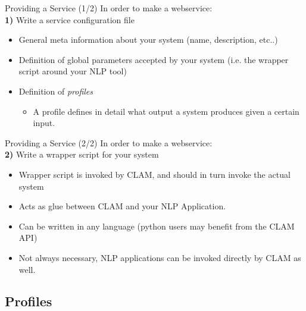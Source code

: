 \documentclass[compress]{beamer}
\begin{document}
\begin{frame}
    \begin{block}{Providing a Service (1/2)}
        In order to make a webservice: \\       
        \textbf{1)} Write a service configuration file
        \begin{itemize}
            \item General meta information about your system {\footnotesize{(name, description, etc..)}}
            \item Definition of global parameters accepted by your system {\footnotesize{(i.e. the wrapper script around your NLP tool)}}
            \item Definition of \emph{profiles}
            \begin{itemize}
                \item A profile defines in detail what output a system produces given a certain input.                    
            \end{itemize}
        \end{itemize}    
    
    \end{block}

\end{frame}            

\begin{frame}
    \begin{block}{Providing a Service (2/2)}
        In order to make a webservice: \\
        \textbf{2)} Write a wrapper script for your system
        \begin{itemize}
            \item Wrapper script is invoked by CLAM, and should in turn invoke the actual system
            \item Acts as glue between CLAM and your NLP Application.
            \item Can be written in any language (python users may benefit from the CLAM API)
            \item Not always necessary, NLP applications can be invoked directly by CLAM as well.
        \end{itemize}
    
    \end{block}

\end{frame}

\subsection{Profiles}
\end{document}
